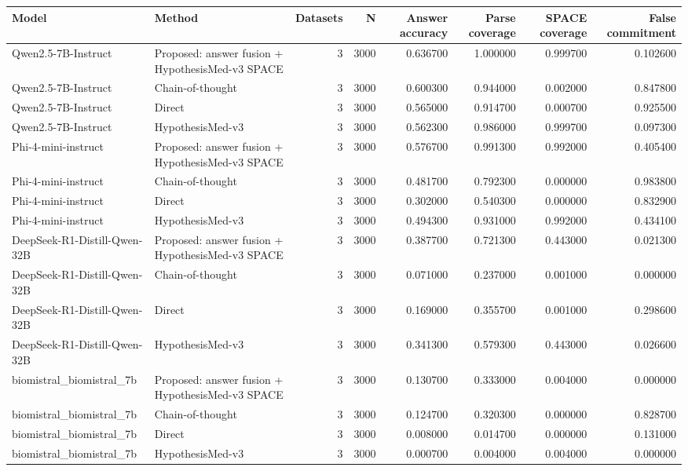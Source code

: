 \begin{tabular}{llrrrrrr}
\toprule
Model & Method & Datasets & N & Answer accuracy & Parse coverage & SPACE coverage & False commitment \\
\midrule
Qwen2.5-7B-Instruct & Proposed: answer fusion + HypothesisMed-v3 SPACE & 3 & 3000 & 0.636700 & 1.000000 & 0.999700 & 0.102600 \\
Qwen2.5-7B-Instruct & Chain-of-thought & 3 & 3000 & 0.600300 & 0.944000 & 0.002000 & 0.847800 \\
Qwen2.5-7B-Instruct & Direct & 3 & 3000 & 0.565000 & 0.914700 & 0.000700 & 0.925500 \\
Qwen2.5-7B-Instruct & HypothesisMed-v3 & 3 & 3000 & 0.562300 & 0.986000 & 0.999700 & 0.097300 \\
Phi-4-mini-instruct & Proposed: answer fusion + HypothesisMed-v3 SPACE & 3 & 3000 & 0.576700 & 0.991300 & 0.992000 & 0.405400 \\
Phi-4-mini-instruct & Chain-of-thought & 3 & 3000 & 0.481700 & 0.792300 & 0.000000 & 0.983800 \\
Phi-4-mini-instruct & Direct & 3 & 3000 & 0.302000 & 0.540300 & 0.000000 & 0.832900 \\
Phi-4-mini-instruct & HypothesisMed-v3 & 3 & 3000 & 0.494300 & 0.931000 & 0.992000 & 0.434100 \\
DeepSeek-R1-Distill-Qwen-32B & Proposed: answer fusion + HypothesisMed-v3 SPACE & 3 & 3000 & 0.387700 & 0.721300 & 0.443000 & 0.021300 \\
DeepSeek-R1-Distill-Qwen-32B & Chain-of-thought & 3 & 3000 & 0.071000 & 0.237000 & 0.001000 & 0.000000 \\
DeepSeek-R1-Distill-Qwen-32B & Direct & 3 & 3000 & 0.169000 & 0.355700 & 0.001000 & 0.298600 \\
DeepSeek-R1-Distill-Qwen-32B & HypothesisMed-v3 & 3 & 3000 & 0.341300 & 0.579300 & 0.443000 & 0.026600 \\
biomistral\_biomistral\_7b & Proposed: answer fusion + HypothesisMed-v3 SPACE & 3 & 3000 & 0.130700 & 0.333000 & 0.004000 & 0.000000 \\
biomistral\_biomistral\_7b & Chain-of-thought & 3 & 3000 & 0.124700 & 0.320300 & 0.000000 & 0.828700 \\
biomistral\_biomistral\_7b & Direct & 3 & 3000 & 0.008000 & 0.014700 & 0.000000 & 0.131000 \\
biomistral\_biomistral\_7b & HypothesisMed-v3 & 3 & 3000 & 0.000700 & 0.004000 & 0.004000 & 0.000000 \\
\bottomrule
\end{tabular}
